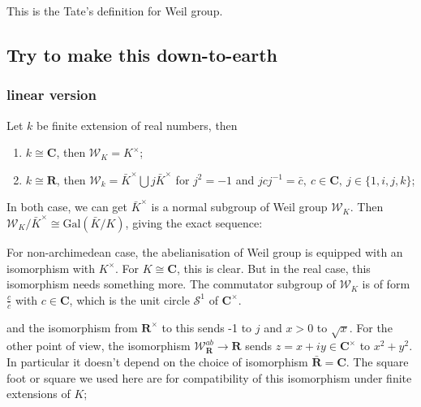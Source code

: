 \documentclass{article}
\theoremstyle{theorem}
\begin{document}
This is the Tate's definition for Weil group.
\subsection{Try to make this down-to-earth}
\subsubsection{linear version}
Let $k$ be finite extension of real numbers, then
\begin{enumerate}
    \item $k\cong \mathbf{C}$, then $\mathcal{W}_{K}=K^{\times}$;
    \item $k\cong \mathbf{R}$, then $\mathcal{W}_{k}= \bar{K}^{\times}\bigcup j\bar{K}^{\times}$ for $j^{2}=-1$ and $jcj^{-1}=\bar{c},\ c\in \mathbf{C},\ j\in\{1,i,j,k\}$;
\end{enumerate}
In both case, we can get $\bar{K}^{\times}$ is a normal subgroup of Weil group $\mathcal{W}_{K}$. Then $\mathcal{W}_{K}/\bar{K}^{\times}\cong \text{Gal}(\bar{K}/K)$, giving the exact sequence:
For non-archimedean case, the abelianisation of Weil group is equipped with an isomorphism with $K^{\times}$. For $K\cong \mathbf{C}$, this is clear. But in the real case, this isomorphism needs something more. The commutator subgroup of $\mathcal{W}_{K}$ is of form $\frac{c}{\bar{c}}$ with $c\in\mathbf{C}$, which is the unit circle $\mathcal{S}^{1}$ of $\mathbf{C}^{\times}$.


and the isomorphism from $\mathbf{R}^{\times}$ to this sends -1 to $j$ and $x>0$ to $\sqrt{x}$. For the other point of view, the isomorphism $\mathcal{W}^{ab}_{\mathbf{R}}\rightarrow \mathbf{R}$ sends $z=x+iy\in \mathbf{C}^{\times}$ to $x^{2}+y^{2}$. In particular it doesn't depend on the choice of isomorphism $\bar{\mathbf{R}}=\mathbf{C}$. The square foot or square we used here are for compatibility of this isomorphism under finite extensions of $K$; 
\end{document}
